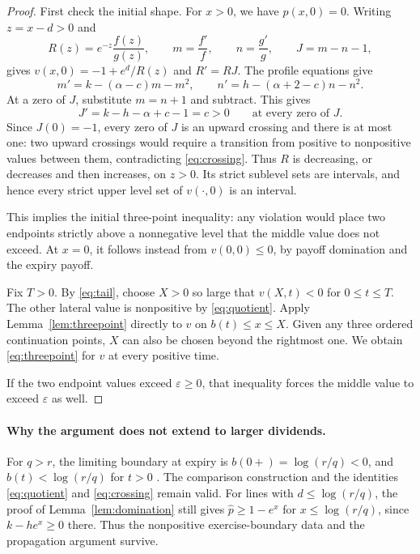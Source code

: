\documentclass[11pt]{article}
\newcommand{\phat}{\widehat p}
\begin{document}
\begin{proof}
First check the initial shape. For $x>0$, we have $p(x,0)=0$.
Writing $z=x-d>0$ and
\[
  R(z)=e^{-z}\frac{f(z)}{g(z)},\qquad
  m=\frac{f'}f,\qquad n=\frac{g'}g,\qquad J=m-n-1,
\]
gives $v(x,0)=-1+e^d/R(z)$ and $R'=RJ$.
The profile equations give
\[
  m'=k-(\alpha-c)m-m^2,\qquad
  n'=h-(\alpha+2-c)n-n^2.
\]
At a zero of $J$, substitute $m=n+1$ and subtract. This gives
\begin{equation}\label{eq:crossing}
  J'=k-h-\alpha+c-1=c>0\qquad\text{at every zero of }J.
\end{equation}
Since $J(0)=-1$, every zero of $J$ is an upward crossing and there
is at most one: two upward crossings would require a transition
from positive to nonpositive values between them, contradicting
\eqref{eq:crossing}.
Thus $R$ is decreasing, or decreases and then increases, on $z>0$.
Its strict sublevel sets are intervals,
and hence every strict upper level set of $v(\cdot,0)$ is an interval.

This implies the initial three-point inequality: any violation
would place two endpoints strictly above a nonnegative level that
the middle value does not exceed. At $x=0$, it follows instead from
$v(0,0)\le0$, by payoff domination and the expiry payoff.

Fix $T>0$. By \eqref{eq:tail}, choose $X>0$ so large that
$v(X,t)<0$ for $0\le t\le T$. The other lateral value is nonpositive
by \eqref{eq:quotient}. Apply Lemma~\ref{lem:threepoint} directly to
$v$ on $b(t)\le x\le X$. Given any three ordered continuation
points, $X$ can also be chosen beyond the rightmost one. We obtain
\eqref{eq:threepoint} for $v$ at every positive time.

If the two endpoint values exceed $\varepsilon\ge0$, that inequality
forces the middle value to exceed $\varepsilon$ as well.
\end{proof}

\paragraph{Why the argument does not extend to larger dividends.}
For $q>r$, the limiting boundary at expiry is
$b(0+)=\log(r/q)<0$, and $b(t)<\log(r/q)$ for $t>0$
\cite[\S3.1 and Theorem~3]{CCC2013}. The comparison construction and
the identities \eqref{eq:quotient} and \eqref{eq:crossing} remain valid.
For lines with $d\le\log(r/q)$, the proof of
Lemma~\ref{lem:domination} still gives $\phat\ge1-e^x$ for
$x\le\log(r/q)$, since $k-he^x\ge0$ there. Thus the nonpositive
exercise-boundary data and the propagation argument survive.
\end{document}
